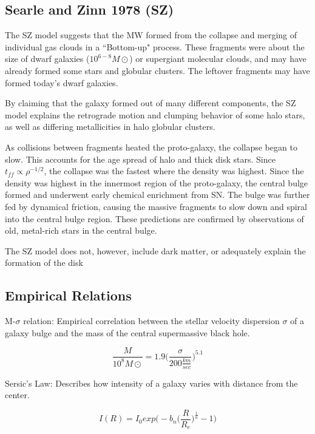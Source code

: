 \subsection{Searle and Zinn 1978 (SZ)}

The SZ model suggests that the MW formed from the collapse and merging of individual gas clouds in a ``Bottom-up" process. These fragments were about the size of dwarf galaxies ($10^{6-8} M\odot$) or supergiant molecular clouds, and may have already formed some stars and globular clusters. The leftover fragments may have formed today's dwarf galaxies. 

By claiming that the galaxy formed out of many different components, the SZ model explains the retrograde motion and clumping behavior of some halo stars, as well as differing metallicities in halo globular clusters. 

As collisions between fragments heated the proto-galaxy, the collapse began to
slow. This accounts for the age spread of halo and thick disk stars. Since
$t_{ff} \propto \rho^{-1/2}$, the collapse was the fastest where the density was highest. Since the density was highest in the innermost region of the proto-galaxy, the central bulge formed and underwent early chemical enrichment from SN. The bulge was further fed by dynamical friction, causing the massive fragments to slow down and spiral into the central bulge region. These predictions are confirmed by observations of old, metal-rich stars in the central bulge. 

The SZ model does not, however, include dark matter, or adequately explain the formation of the disk 

\subsection{Empirical Relations}

M-$\sigma$ relation:  Empirical correlation between the stellar velocity dispersion $\sigma$ of a galaxy bulge and the mass of the central supermassive black hole.

\begin{equation}
\frac{M}{10^8M\odot} = 1.9\bigg(\frac{\sigma}{200 \frac{km}{sec}}\bigg)^{5.1}
\end{equation}

Sersic's Law:  Describes how intensity of a galaxy varies with distance from the center.  

\begin{equation}
I(R) = I_0exp\bigg(-b_n\bigg(\frac{R}{R_e}\bigg)^{\frac{1}{n}} - 1\bigg)
\end{equation}

